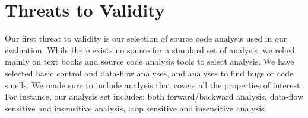 \chapter{Threats to Validity}
\label{sec:threats}
Our first threat to validity is our selection of source code analysis used in our
evaluation. While there exists no source for a standard set of analysis, we
relied mainly on text books and source code analysis tools to select analysis. We
have selected basic control and data-flow analyses, and analyses to find bugs or
code smells.
We made sure to include analysis that covers all the properties of interest. For
instance, our analysis set includes: both forward/backward analysis, data-flow sensitive and insensitive analysis, loop sensitive and insensitive
analysis. 

